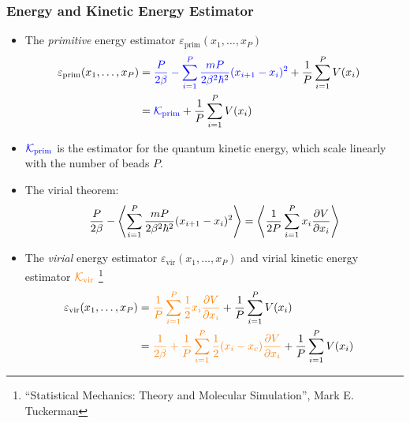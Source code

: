 \begin{frame}
  \frametitle{Energy and Kinetic Energy Estimator}

  \begin{itemize}
    \item
    The \emph{primitive} energy estimator $\varepsilon_{\text{prim}}(x_1,\ldots,x_P)$
    \begin{align*}
        \varepsilon_{\text{prim}}(x_1,\ldots,x_P) &=
                                        \mathcolor{blue}{
                                        {P\over2\beta} - \sum_{i=1}^P
                                        {mP\over2\beta^2\hbar^2} (x_{i+1} - x_i)^2}
                                        + {1\over P}\sum_{i=1}^P V(x_i) \cr
                                        &= \mathcolor{blue}{{\cal K}_{\text{prim}}} +
                                        {1\over P}\sum_{i=1}^P V(x_i)
    \end{align*}
    \item $\mathcolor{blue}{{\cal K}_{\text{prim}}}$ is the estimator for the
        quantum kinetic energy, which scale linearly with the number of beads $P$.
    \item The virial theorem:
        \begin{equation*}
        {P\over 2\beta} - \left\langle \sum_{i=1}^P {mP\over2\beta^2\hbar^2}
            (x_{i+1} - x_i)^2 \right\rangle = \left\langle {1\over 2P} \sum_{i=1}^P
            x_i {\partial V\over\partial x_i} \right\rangle
        \end{equation*}

    \item The \emph{virial} energy  estimator
      $\varepsilon_{\text{vir}}(x_1,\ldots,x_P)$ and virial kinetic energy
      estimator $\mathcolor{orange}{{\cal K}_{\text{vir}}}$
    \footnote{
    ``Statistical Mechanics: Theory and Molecular Simulation'', Mark E. Tuckerman 
    }
        \begin{align*}
        \varepsilon_{\text{vir}}(x_1,\ldots,x_P) &= \mathcolor{orange}{{1\over P} \sum_{i=1}^P {1\over 2} x_i
                                   {\partial V\over\partial x_i} } + {1\over P} \sum_{i=1}^P V(x_i) \cr
          &= \mathcolor{orange}{
            {1\over2\beta} + {1\over P} \sum_{i=1}^P
            {1\over 2} (x_i - x_c) {\partial V\over\partial x_i}}
            + {1\over P} \sum_{i=1}^P V(x_i)
        \end{align*}
  \end{itemize}
\end{frame}